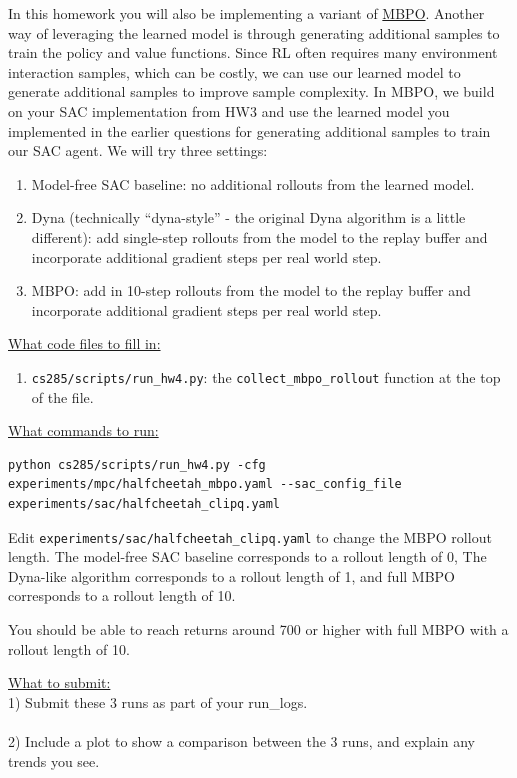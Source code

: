 \documentclass{article} %
\begin{document}
In this homework you will also be implementing a variant of \href{https://arxiv.org/pdf/1906.08253}{MBPO}. Another way of leveraging the learned model is through generating additional samples to train the policy and value functions. Since RL often requires many environment interaction samples, which can be costly, we can use our learned model to generate additional samples to improve sample complexity. In MBPO, we build on your SAC implementation from HW3 and use the learned model you implemented in the earlier questions for generating additional samples to train our SAC agent. We will try three settings:
\begin{enumerate}
    \item Model-free SAC baseline: no additional rollouts from the learned model.
    \item Dyna (technically ``dyna-style'' - the original Dyna algorithm is a little different): add single-step rollouts from the model to the replay buffer and incorporate additional gradient steps per real world step. 
    \item MBPO: add in 10-step rollouts from the model to the replay buffer and incorporate additional gradient steps per real world step. 
\end{enumerate}

\underline{What code files to fill in:}
\begin{enumerate}
    \item \verb+cs285/scripts/run_hw4.py+: the \verb+collect_mbpo_rollout+ function at the top of the file.
\end{enumerate}

\underline{What commands to run:}\\
\begin{lstlisting}[escapechar=@]
python cs285/scripts/run_hw4.py -cfg experiments/mpc/halfcheetah_mbpo.yaml --sac_config_file experiments/sac/halfcheetah_clipq.yaml
\end{lstlisting}

Edit \verb+experiments/sac/halfcheetah_clipq.yaml+ to change the MBPO rollout length. The model-free SAC baseline corresponds to a rollout length of 0, The Dyna-like algorithm corresponds to a rollout length of 1, and full MBPO corresponds to a rollout length of 10.

You should be able to reach returns around 700 or higher with full MBPO with a rollout length of 10.

\underline{What to submit:}\\
1) Submit these 3 runs as part of your run\_logs.\\ \\
2) Include a plot to show a comparison between the 3 runs, and explain any trends you see.
\end{document}
